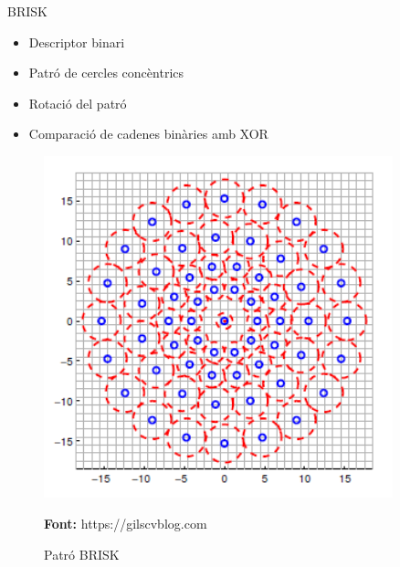 \documentclass[xcolor=table, 11pt]{beamer}
\newcommand*{\captionsource}[2]{%
  \caption[{#1}]{#1}\par
  \vspace{-0.4cm}
  \tiny{\textbf{Font:} #2\par}}
\newcommand\tz{\fontsize{13}{15.6}\selectfont}
\begin{document}
	\begin{frame}{BRISK}
		\tz
		\begin{minipage}{0.53\textwidth}
			\begin{itemize}
				\item Descriptor binari
				\item Patró de cercles concèntrics
				\item Rotació del patró
				\item Comparació de cadenes binàries amb XOR
			\end{itemize}
		\end{minipage}
		\hfill
		\begin{minipage}{0.45\textwidth}
			\begin{figure}[H]
				\includegraphics[width=0.9\textwidth]{images/brisk}
				\captionsource{Patró BRISK\vspace{0.1cm}}{https://gilscvblog.com}
			\end{figure}
		\end{minipage}
	\end{frame}
\end{document}
